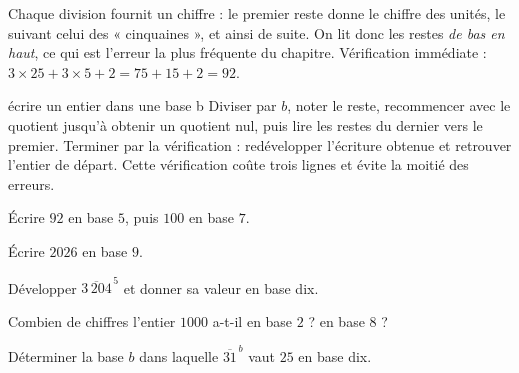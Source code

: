 \begin{visualisation}
\begin{center}
\end{center}

Chaque division fournit un chiffre : le premier reste donne le chiffre des
unités, le suivant celui des « cinquaines », et ainsi de suite. On lit donc
les restes \emph{de bas en haut}, ce qui est l'erreur la plus fréquente du
chapitre. Vérification immédiate :
$3\times25+3\times5+2 = 75+15+2 = 92$.
\end{visualisation}

\begin{methode}{écrire un entier dans une base b}
Diviser par $b$, noter le reste, recommencer avec le quotient jusqu'à obtenir
un quotient nul, puis lire les restes du dernier vers le premier. Terminer par
la vérification : redévelopper l'écriture obtenue et retrouver l'entier de
départ. Cette vérification coûte trois lignes et évite la moitié des erreurs.
\end{methode}

\begin{entrainement}
\exo[\niveau{1}] Écrire $92$ en base $5$, puis $100$ en base $7$.

\exo[\niveau{1}] Écrire $2026$ en base $9$.

\exo[\niveau{2}] Développer $\overline{3\,204}^{\,5}$ et donner sa valeur en
base dix.

\exo[\niveau{2}] Combien de chiffres l'entier $1000$ a-t-il en base $2$ ? en
base $8$ ?

\exo[\niveau{3}] Déterminer la base $b$ dans laquelle $\overline{31}^{\,b}$
vaut $25$ en base dix.
\end{entrainement}

